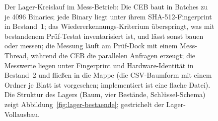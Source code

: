 \begin{nurkurz}
\begin{figure}[htbp]
\caption{Der Lager-Kreislauf im Mess-Betrieb: Die CEB baut in Batches zu je 4096 Binaries; jede Binary
liegt unter ihrem SHA-512-Fingerprint in Bestand~1; das Wiedererkennungs-Kriterium überspringt, was mit bestandenem
Prüf-Testat inventarisiert ist, und lässt sonst bauen oder messen; die Messung läuft am Prüf-Dock mit
einem Mess-Thread, während die CEB die parallelen Anfragen erzeugt; die Messwerte liegen unter
Fingerprint und Hardware-Identität in Bestand~2 und fließen in die Mappe (die CSV-Baumform mit einem
Ordner je Blatt ist vorgesehen; implementiert ist eine flache Datei). Die Struktur des Lagers
(Baum, vier Bestände, Schlüssel-Schema) zeigt Abbildung~\ref{fig:lager-bestaende}; gestrichelt der
Lager-Vollausbau.}\label{fig:eval-lager-kreislauf}
\end{figure}
\end{nurkurz}


